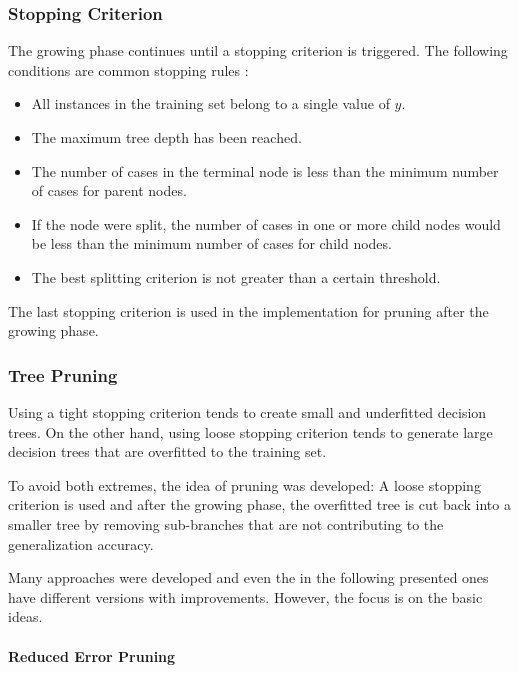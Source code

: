 \subsubsection{Stopping Criterion}

The growing phase continues until a stopping criterion is triggered. The following conditions are common stopping rules \cite[p. 63]{rokach2008data}:
\begin{itemize}
    \item All instances in the training set belong to a single value of $y$.
    \item The maximum tree depth has been reached.
    \item The number of cases in the terminal node is less than the minimum
number of cases for parent nodes.
    \item If the node were split, the number of cases in one or more child nodes
would be less than the minimum number of cases for child nodes.
    \item The best splitting criterion is not greater than a certain threshold.
\end{itemize}


\begin{remark}
    The last stopping criterion is used in the implementation for pruning after the growing phase.\label{stoppingcriterionimpl}
\end{remark}



\subsubsection{Tree Pruning}\label{treepruning}

Using a tight stopping criterion tends to create small and underfitted decision trees. On the other hand, using  loose stopping criterion tends to generate large decision trees that are overfitted to the training set. 

To avoid both extremes, the idea of pruning was developed: A loose stopping criterion is used and after the growing phase, the overfitted tree is cut back into a smaller tree by removing sub-branches that are not contributing to the generalization accuracy. 

Many approaches were developed and even the in the following presented ones have different versions with improvements. However, the focus is on the basic ideas. 


\paragraph{Reduced Error Pruning}

